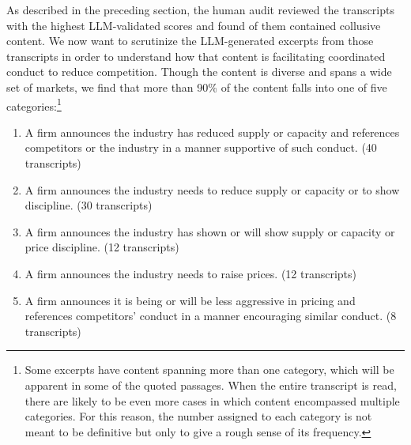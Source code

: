 As described in the preceding section, the human audit reviewed the  
transcripts with the highest LLM-validated scores and found  
of them contained collusive content. We now want to scrutinize the LLM-generated 
excerpts from those  transcripts in order 
to understand how that content is facilitating coordinated conduct to reduce competition.
Though the content is diverse and spans a wide set of markets, we find that more 
than 90\% of the content falls into one of five categories:\footnote{Some excerpts 
have content spanning more than one category, which will be apparent in some of 
the quoted passages. When the entire transcript is read, there are likely to be 
even more cases in which content encompassed multiple categories. For this reason, 
the number assigned to each category is not meant to be definitive but only to 
give a rough sense of its frequency.}

\begin{enumerate}
    \item A firm announces the industry has reduced supply or capacity and references competitors or the industry in a manner supportive of such conduct. (40 transcripts)
    \item A firm announces the industry needs to reduce supply or capacity or to show discipline. (30 transcripts)
    \item A firm announces the industry has shown or will show supply or capacity or price discipline. (12 transcripts)
    \item A firm announces the industry needs to raise prices. (12 transcripts)
    \item A firm announces it is being or will be less aggressive in pricing and references competitors' conduct in a manner encouraging similar conduct. (8 transcripts)
\end{enumerate}

